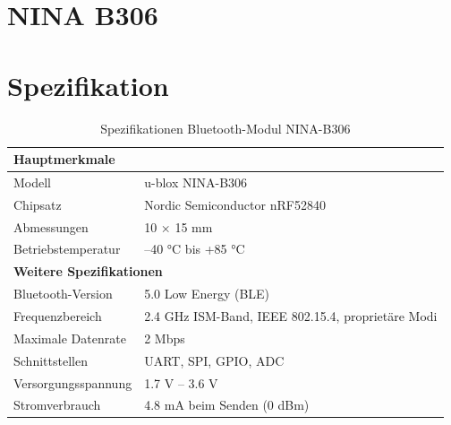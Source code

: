 \section{NINA B306}

\section{Spezifikation}
\begin{longtable}{|p{5cm}|p{8cm}|}
	\caption{Spezifikationen Bluetooth-Modul NINA-B306}
	\label{tab:specs_nina_b306} \\
	
	\hline
	\multicolumn{2}{|l|}{\textbf{Hauptmerkmale}} \\
	\hline
	Modell & u-blox NINA-B306 \\
	\hline
	Chipsatz & Nordic Semiconductor nRF52840 \\
	\hline
	Abmessungen & 10 × 15 mm \\
	\hline
	Betriebstemperatur & –40 °C bis +85 °C \\
	\hline
	
	\multicolumn{2}{|l|}{\textbf{Weitere Spezifikationen}} \\
	\hline
	Bluetooth-Version & 5.0 Low Energy (BLE) \\
	\hline
	Frequenzbereich & 2.4 GHz ISM-Band, IEEE 802.15.4, proprietäre Modi \\
	\hline
	Maximale Datenrate & 2 Mbps \\
	\hline
	Schnittstellen & UART, SPI, GPIO, ADC \\
	\hline
	Versorgungsspannung & 1.7 V – 3.6 V \\
	\hline
	Stromverbrauch & 4.8 mA beim Senden (0 dBm) \\
	\hline
\end{longtable}

\cite{ublox:2017}

